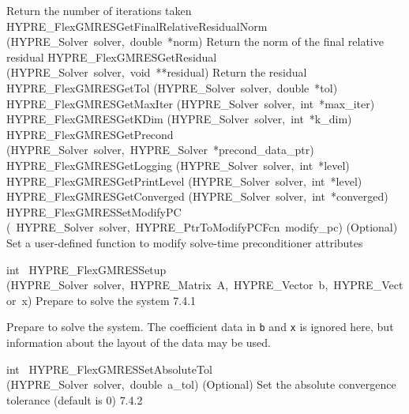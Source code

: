 \documentclass{article}
\begin{document}
\begin{cxxentry}
\begin{cxxentry}
\begin{cxxnames}
        {
Return the number of iterations taken}
        {}
\label{cxx.7.4.10}
        {HYPRE\_FlexGMRESGetFinalRelativeResidualNorm}
        {(HYPRE\_Solver\ solver,\ double\ *norm)}
        {
Return the norm of the final relative residual}
        {}
\label{cxx.7.4.11}
        {HYPRE\_FlexGMRESGetResidual}
        {(HYPRE\_Solver\ solver,\ void\ **residual)}
        {
Return the residual}
        {}
\label{cxx.7.4.12}
        {HYPRE\_FlexGMRESGetTol}
        {(HYPRE\_Solver\ solver,\ double\ *tol)}
        {}
        {}
\label{cxx.7.4.13}
        {HYPRE\_FlexGMRESGetMaxIter}
        {(HYPRE\_Solver\ solver,\ int\ *max\_iter)}
        {}
        {}
\label{cxx.7.4.14}
        {HYPRE\_FlexGMRESGetKDim}
        {(HYPRE\_Solver\ solver,\ int\ *k\_dim)}
        {}
        {}
\label{cxx.7.4.15}
        {HYPRE\_FlexGMRESGetPrecond}
        {(HYPRE\_Solver\ solver,\ HYPRE\_Solver\ *precond\_data\_ptr)}
        {}
        {}
\label{cxx.7.4.16}
        {HYPRE\_FlexGMRESGetLogging}
        {(HYPRE\_Solver\ solver,\ int\ *level)}
        {}
        {}
\label{cxx.7.4.17}
        {HYPRE\_FlexGMRESGetPrintLevel}
        {(HYPRE\_Solver\ solver,\ int\ *level)}
        {}
        {}
\label{cxx.7.4.18}
        {HYPRE\_FlexGMRESGetConverged}
        {(HYPRE\_Solver\ solver,\ int\ *converged)}
        {}
        {}
\label{cxx.7.4.19}
        {HYPRE\_FlexGMRESSetModifyPC}
        {(\ HYPRE\_Solver\ solver,\ HYPRE\_PtrToModifyPCFcn\ modify\_pc)}
        {
(Optional) Set a user-defined function to modify solve-time preconditioner
attributes}
        {}
\label{cxx.7.4.20}
\end{cxxnames}
\begin{cxxfunction}
{int\ }
        {HYPRE\_FlexGMRESSetup}
        {(HYPRE\_Solver\ solver,\ HYPRE\_Matrix\ A,\ HYPRE\_Vector\ b,\ HYPRE\_Vector\ x)}
        {
Prepare to solve the system}
        {7.4.1}
\begin{cxxdoc}

Prepare to solve the system.  The coefficient data in {\tt b} and {\tt x} is
ignored here, but information about the layout of the data may be used.
\end{cxxdoc}
\end{cxxfunction}
\begin{cxxfunction}
{int\ }
        {HYPRE\_FlexGMRESSetAbsoluteTol}
        {(HYPRE\_Solver\ solver,\ double\ a\_tol)}
        {
(Optional) Set the absolute convergence tolerance (default is 0)}
        {7.4.2}
\begin{cxxdoc}


\end{cxxdoc}
\end{cxxfunction}
\end{cxxentry}
\end{cxxentry}
\end{document}
